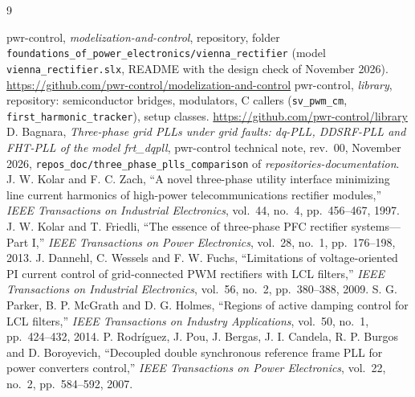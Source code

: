\documentclass[11pt,a4paper]{scrartcl}
\newcommand{\code}[1]{\texttt{#1}}
\newcommand{\us}{\_\allowbreak}  %
\begin{document}
\begin{onehalfspace}
\begin{thebibliography}{9}
	\raggedright
	 pwr-control, \emph{modelization-and-control}, repository, folder \code{foundations\us of\us power\us electronics/\allowbreak vienna\us rectifier} (model \code{vienna\_rectifier.slx}, README with the design check of November 2026). \url{https://github.com/pwr-control/modelization-and-control}
	 pwr-control, \emph{library}, repository: semiconductor bridges, modulators, C callers (\code{sv\_pwm\_cm}, \code{first\_harmonic\_tracker}), setup classes. \url{https://github.com/pwr-control/library}
	 D. Bagnara, \emph{Three-phase grid PLLs under grid faults: dq-PLL, DDSRF-PLL and FHT-PLL of the model frt\_dqpll}, pwr-control technical note, rev.~00, November 2026, \code{repos\_doc/\allowbreak three\us phase\us plls\us comparison} of \emph{repositories-documentation}.
	 J. W. Kolar and F. C. Zach, ``A novel three-phase utility interface minimizing line current harmonics of high-power telecommunications rectifier modules,'' \emph{IEEE Transactions on Industrial Electronics}, vol.~44, no.~4, pp.~456--467, 1997.
	 J. W. Kolar and T. Friedli, ``The essence of three-phase PFC rectifier systems---Part I,'' \emph{IEEE Transactions on Power Electronics}, vol.~28, no.~1, pp.~176--198, 2013.
	 J. Dannehl, C. Wessels and F. W. Fuchs, ``Limitations of voltage-oriented PI current control of grid-connected PWM rectifiers with LCL filters,'' \emph{IEEE Transactions on Industrial Electronics}, vol.~56, no.~2, pp.~380--388, 2009.
	 S. G. Parker, B. P. McGrath and D. G. Holmes, ``Regions of active damping control for LCL filters,'' \emph{IEEE Transactions on Industry Applications}, vol.~50, no.~1, pp.~424--432, 2014.
	 P. Rodr\'iguez, J. Pou, J. Bergas, J. I. Candela, R. P. Burgos and D. Boroyevich, ``Decoupled double synchronous reference frame PLL for power converters control,'' \emph{IEEE Transactions on Power Electronics}, vol.~22, no.~2, pp.~584--592, 2007.
\end{thebibliography}

\end{onehalfspace}
\end{document}
